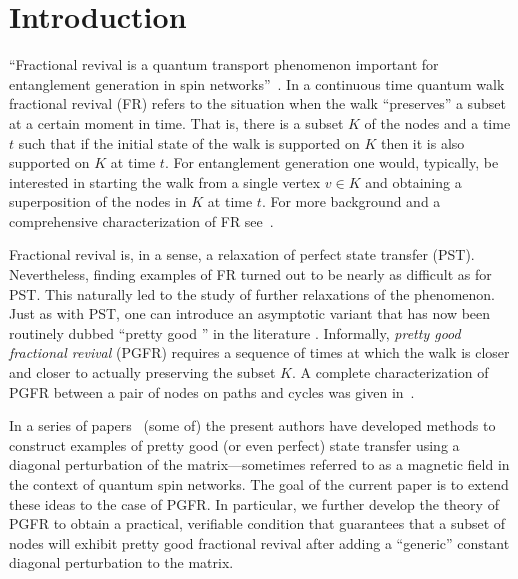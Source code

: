 \section{Introduction}
``Fractional revival is a quantum transport phenomenon important for entanglement generation in spin networks''~\cite{ChanCoutinhoTamonVinetZhan}. In a continuous time quantum walk fractional revival (FR) refers to the situation when the walk ``preserves'' a subset at a certain moment in time. That is, there is a subset $K$ of the nodes and a time $t$ such that if the initial state of the walk is supported on $K$ then it is also supported on $K$ at time $t$. For entanglement generation one would, typically, be interested in starting the walk from a single vertex $v\in K$ and obtaining a superposition of the nodes in $K$ at time $t$. For more background and a comprehensive characterization of FR see~\cite{chan2020fundamentals}.

Fractional revival is, in a sense, a relaxation of perfect state transfer (PST). Nevertheless, finding examples of FR turned out to be nearly as difficult as for PST. This naturally led to the study of further relaxations of the phenomenon. Just as with PST, one can introduce an asymptotic variant that has now been routinely dubbed ``pretty good \underline{\phantom{PST}}'' in the literature \cite{Vinet2012,Godsil2012}. Informally, \emph{pretty good fractional revival} (PGFR) requires a sequence of times at which the walk is closer and closer to actually preserving the subset $K$. A complete characterization of PGFR between a pair of nodes on paths and cycles was given in~\cite{chan2020approximate}. 

In a series of papers~\cite{us, invol, eisenberg2019pretty} (some of) the present authors have developed methods to construct examples of pretty good (or even perfect) state transfer using a diagonal perturbation of the matrix---sometimes referred to as a magnetic field in the context of quantum spin networks. The goal of the current paper is to extend these ideas to the case of PGFR. In particular, we further develop the theory of PGFR to obtain a practical, verifiable condition that guarantees that a subset of nodes will exhibit pretty good fractional revival after adding a ``generic'' constant diagonal perturbation to the matrix. 

